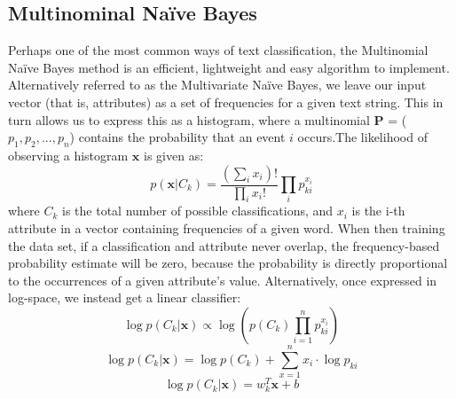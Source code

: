 \documentclass{article}
\begin{document}
\subsection{Multinominal Naïve Bayes}
Perhaps one of the most common ways of text classification, the Multinomial Naïve Bayes method is an efficient, lightweight and easy algorithm to implement. Alternatively referred to as the Multivariate Naïve Bayes, we leave our input vector (that is, attributes) as a set of frequencies for a given text string. This in turn allows us to express this as a histogram, where a multinomial \newline $\mathbf{P}$  = ($p_1, p_2, ..., p_n$) contains the probability that an event $i$ occurs.\newline The likelihood of observing a histogram $\mathbf{x}$ is given as:
\begin{equation*}
    p(\mathbf{x}|C_k) = \frac{(\sum_i x_i)!}{\prod_i x_i!} \prod_i p_{ki}^{x_i}
\end{equation*}
where $C_k$ is the total number of possible classifications, and $x_i$ is the i-th attribute in a vector containing frequencies of a given word.\newline
When then training the data set, if a classification and attribute never overlap, the frequency-based probability estimate will be zero, because the probability is directly proportional to the occurrences of a given attribute's value. \newline
Alternatively, once expressed in log-space, we instead get a linear classifier:
\begin{equation*}
    \log p(C_k | \mathbf{x}) \propto \log \left( p(C_k) \prod_{i=1}^n p_{ki}^{x_i} \right)
\end{equation*}
\begin{equation*}
    \log p(C_k | \mathbf{x}) = \log p(C_k) + \sum_{x=1}^n x_i \cdot \log p_{ki}
\end{equation*}
\begin{equation*}
    \log p(C_k | \mathbf{x}) = w_k^T \mathbf{x} + b
\end{equation*}
\newpage
\end{document}
